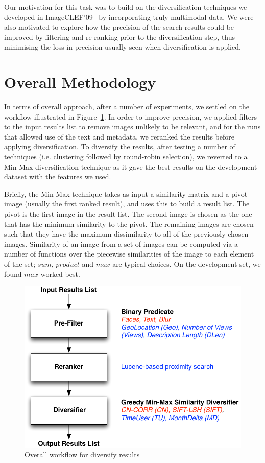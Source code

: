 \documentclass{../acm_proc_article-me11_tweaked}
\begin{document}
Our motivation for this task was to build on the diversification techniques we developed in ImageCLEF'09~\cite{} by incorporating truly multimodal data. We were also motivated to explore how the precision of the search results could be improved by filtering and re-ranking prior to the diversification step, thus minimising the loss in precision usually seen when diversification is applied.

\section{Overall Methodology}\label{sec:meth}
In terms of overall approach, after a number of experiments, we settled on the workflow illustrated in Figure~\ref{fig:overview}. In order to improve precision, we applied filters to the input results list to remove images unlikely to be relevant, and for the runs that allowed use of the text and metadata, we reranked the results before applying diversification. To diversify the results, after testing a number of techniques (i.e. clustering followed by round-robin selection), we reverted to a Min-Max diversification technique as it gave the best results on the development dataset with the features we used. 

Briefly, the Min-Max technique takes as input a similarity matrix and a pivot image (usually the first ranked result), and uses this to build a result list. The pivot is the first image in the result list. The second image is chosen as the one that has the minimum similarity to the pivot. The remaining images are chosen such that they have the maximum dissimilarity to all of the previously chosen images. Similarity of an image from a set of images can be computed via a number of functions over the piecewise similarities of the image to each element of the set; $sum$, $product$ and $max$ are typical choices. On the development set, we found $max$ worked best.

\begin{figure}
	\includegraphics[width=\columnwidth]{images/overview}
	\caption{\label{fig:overview}Overall workflow for diversify results}
\end{figure}
\end{document}

